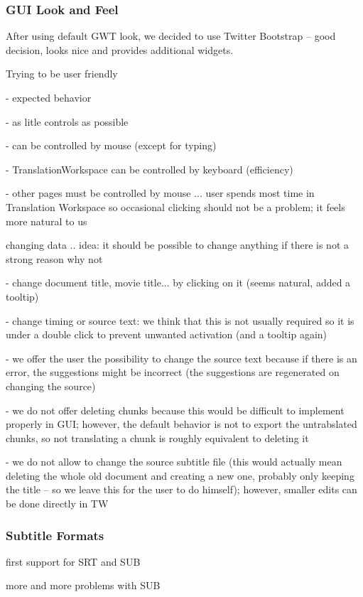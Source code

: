 \subsubsection{GUI Look and Feel}

After using default GWT look, we decided to use Twitter Bootstrap -- good decision, looks nice and provides additional widgets.

Trying to be user friendly

- expected behavior

- as litle controls as possible

- can be controlled by mouse (except for typing)

- TranslationWorkspace can be controlled by keyboard (efficiency)

- other pages must be controlled by mouse ... user spends most time in Translation Workspace so occasional clicking should not be a problem; it feels more natural to us

changing data .. idea: it should be possible to change anything if there is not a strong reason why not

- change document title, movie title... by clicking on it (seems natural, added a tooltip)

- change timing or source text: we think that this is not usually required so it is under a double click to prevent unwanted activation (and a tooltip again)

- we offer the user the possibility to change the source text because if there is an error, the suggestions might be incorrect (the suggestions are regenerated on changing the source)

- we do not offer deleting chunks because this would be difficult to implement properly in GUI; however, the default behavior is not to export the untrabslated chunks, so not translating a chunk is roughly equivalent to deleting it

- we do not allow to change the source subtitle file (this would actually mean deleting the whole old document and creating a new one, probably only keeping the title -- so we leave this for the user to do himself); however, smaller edits can be done directly in TW

\subsubsection{Subtitle Formats}

first support for SRT and SUB

more and more problems with SUB

